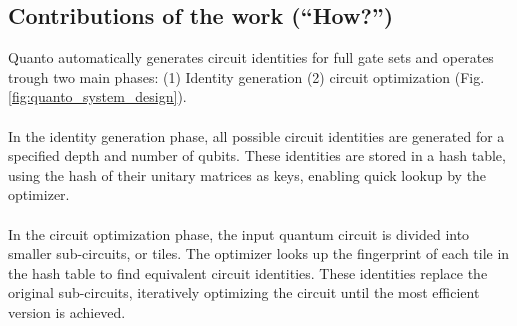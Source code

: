 \subsection{Contributions of the work (``How?'')}

Quanto automatically generates circuit identities for full gate sets and operates trough two main phases: (1) Identity generation (2) circuit optimization (Fig. \ref{fig:quanto_system_design}).
\\\\
In the identity generation phase, all possible circuit identities are generated for a specified depth and number of qubits. These identities are stored in a hash table, using the hash of their unitary matrices as keys, enabling quick lookup by the optimizer.
\\\\
In the circuit optimization phase, the input quantum circuit is divided into smaller sub-circuits, or tiles. The optimizer looks up the fingerprint of each tile in the hash table to find equivalent circuit identities. These identities replace the original sub-circuits, iteratively optimizing the circuit until the most efficient version is achieved.

